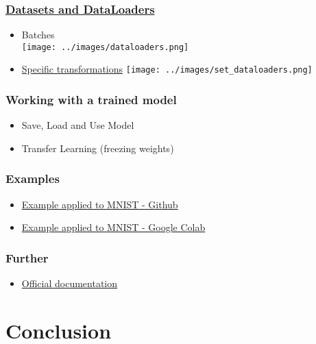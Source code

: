 \begin{frame}[fragile]
   \frametitle{\href{https://pytorch.org/tutorials/beginner/basics/data_tutorial.html}{Datasets and DataLoaders}}
   \begin{itemize}
      \item Batches\\
      \texttt{[image: ../images/dataloaders.png]}
      \item \href{https://pytorch.org/tutorials/beginner/basics/data_tutorial.html}{Specific transformations}
      \texttt{[image: ../images/set\_dataloaders.png]}
   \end{itemize}
\end{frame}


\begin{frame}[fragile]
   \frametitle{Working with a trained model}
   \begin{itemize}
      \item Save, Load and Use Model
      \item Transfer Learning (freezing weights)
   \end{itemize}
\end{frame}



\begin{frame}[fragile]
   \frametitle{Examples}
   \begin{itemize}
      \item \href{https://github.com/pytorch/examples/blob/main/mnist/main.py}{Example applied to MNIST - Github}
      \item \href{https://github.com/pytorch/examples/blob/main/mnist/main.py}{Example applied to MNIST - Google Colab}
   \end{itemize}
\end{frame}

\begin{frame}[fragile]
   \frametitle{Further}
   \begin{itemize}
      \item \href{https://pytorch.org/tutorials/}{Official documentation}
   \end{itemize}
\end{frame}


\section{Conclusion}


